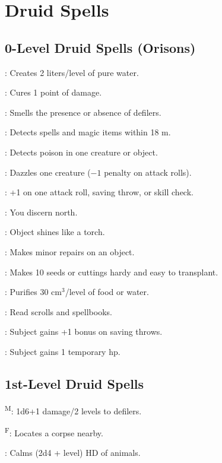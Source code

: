 \section{Druid Spells}



\subsection{0-Level Druid Spells (Orisons)}

: Creates 2 liters/level of pure water.

: Cures 1 point of damage.

: Smells the presence or absence of defilers.

: Detects spells and magic items within 18 m.

: Detects poison in one creature or object.

: Dazzles one creature ($-1$ penalty on attack rolls).

: +1 on one attack roll, saving throw, or skill check.

: You discern north.

: Object shines like a torch.

: Makes minor repairs on an object.

: Makes 10 seeds or cuttings hardy and easy to transplant.

: Purifies 30 cm$^3$/level of food or water.

: Read scrolls and spellbooks.

: Subject gains +1 bonus on saving throws.

: Subject gains 1 temporary hp.



\subsection{1st-Level Druid Spells}

\textsuperscript{M}: 1d6+1 damage/2 levels to defilers.

\textsuperscript{F}: Locates a corpse nearby.

: Calms (2d4 + level) HD of animals.

